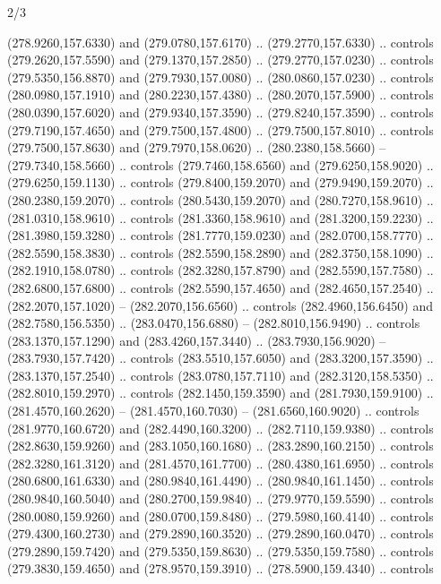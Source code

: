 \begin{flagdescription}{2/3}
\begin{scope}[xshift=0.5\flaglength,yshift=0.5\flagwidth,scale=\flagwidth/259.2]
\begin{scope}[y=0.8pt, x=0.8pt, yscale=-1,shift={(-243,-162)}]
      (278.9260,157.6330) and (279.0780,157.6170) .. (279.2770,157.6330) .. controls
      (279.2620,157.5590) and (279.1370,157.2850) .. (279.2770,157.0230) .. controls
      (279.5350,156.8870) and (279.7930,157.0080) .. (280.0860,157.0230) .. controls
      (280.0980,157.1910) and (280.2230,157.4380) .. (280.2070,157.5900) .. controls
      (280.0390,157.6020) and (279.9340,157.3590) .. (279.8240,157.3590) .. controls
      (279.7190,157.4650) and (279.7500,157.4800) .. (279.7500,157.8010) .. controls
      (279.7500,157.8630) and (279.7970,158.0620) .. (280.2380,158.5660) --
      (279.7340,158.5660) .. controls (279.7460,158.6560) and (279.6250,158.9020) ..
      (279.6250,159.1130) .. controls (279.8400,159.2070) and (279.9490,159.2070) ..
      (280.2380,159.2070) .. controls (280.5430,159.2070) and (280.7270,158.9610) ..
      (281.0310,158.9610) .. controls (281.3360,158.9610) and (281.3200,159.2230) ..
      (281.3980,159.3280) .. controls (281.7770,159.0230) and (282.0700,158.7770) ..
      (282.5590,158.3830) .. controls (282.5590,158.2890) and (282.3750,158.1090) ..
      (282.1910,158.0780) .. controls (282.3280,157.8790) and (282.5590,157.7580) ..
      (282.6800,157.6800) .. controls (282.5590,157.4650) and (282.4650,157.2540) ..
      (282.2070,157.1020) -- (282.2070,156.6560) .. controls (282.4960,156.6450) and
      (282.7580,156.5350) .. (283.0470,156.6880) -- (282.8010,156.9490) .. controls
      (283.1370,157.1290) and (283.4260,157.3440) .. (283.7930,156.9020) --
      (283.7930,157.7420) .. controls (283.5510,157.6050) and (283.3200,157.3590) ..
      (283.1370,157.2540) .. controls (283.0780,157.7110) and (282.3120,158.5350) ..
      (282.8010,159.2970) .. controls (282.1450,159.3590) and (281.7930,159.9100) ..
      (281.4570,160.2620) -- (281.4570,160.7030) -- (281.6560,160.9020) .. controls
      (281.9770,160.6720) and (282.4490,160.3200) .. (282.7110,159.9380) .. controls
      (282.8630,159.9260) and (283.1050,160.1680) .. (283.2890,160.2150) .. controls
      (282.3280,161.3120) and (281.4570,161.7700) .. (280.4380,161.6950) .. controls
      (280.6800,161.6330) and (280.9840,161.4490) .. (280.9840,161.1450) .. controls
      (280.9840,160.5040) and (280.2700,159.9840) .. (279.9770,159.5590) .. controls
      (280.0080,159.9260) and (280.0700,159.8480) .. (279.5980,160.4140) .. controls
      (279.4300,160.2730) and (279.2890,160.3520) .. (279.2890,160.0470) .. controls
      (279.2890,159.7420) and (279.5350,159.8630) .. (279.5350,159.7580) .. controls
      (279.3830,159.4650) and (278.9570,159.3910) .. (278.5900,159.4340) .. controls

\end{scope}
\end{scope}
\end{flagdescription}
